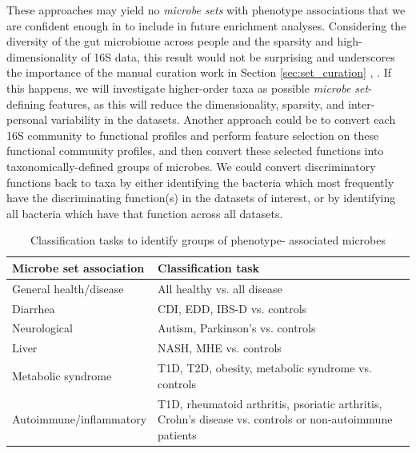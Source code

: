 \documentclass[12pt]{article}
\begin{document}
These approaches may yield no \textit{microbe sets} with phenotype associations
that we are confident enough in to include in future enrichment analyses.
Considering the diversity of the gut microbiome across people and the
sparsity and high-dimensionality of 16S data, 
this result would not be surprising and underscores the importance of the
manual curation work in Section \ref{sec:set_curation} \cite{wang-pval_method-2016}, \cite{knights-biomarkers-2011}.
If this happens, we will investigate higher-order taxa as possible \textit{microbe set}-defining features,
as this will reduce the dimensionality, sparsity, and inter-personal 
variability in the datasets.
Another approach could be to convert each 16S community to functional profiles \cite{langille-picrust-2013}
and perform feature selection on these functional community profiles, and then
convert these selected functions into taxonomically-defined groups of microbes. 
We could convert discriminatory functions back to taxa
by either identifying the bacteria which most frequently have
the discriminating function(s) in the datasets of interest, or by identifying all bacteria which have that function across all datasets.

\begin{table}
\begin{center}
\begin{tabular}{|p{6cm}|p{10cm}|}
	\hline
	\textbf{Microbe set association} & \textbf{Classification task} \\
	\hline
	General health/disease & All healthy vs. all disease \\
	\hline
	Diarrhea & CDI, EDD, IBS-D vs. controls \\
	\hline
	Neurological & Autism, Parkinson's vs. controls \\
	\hline
	Liver & NASH, MHE vs. controls\\
	\hline
	Metabolic syndrome & T1D, T2D, obesity, metabolic syndrome vs. 
	controls \\
	\hline
	Autoimmune/inflammatory & T1D, rheumatoid arthritis, psoriatic arthritis, Crohn's disease 
	vs. controls or non-autoimmune patients \\
	\hline
\end{tabular}
\caption{Classification tasks to identify groups of phenotype-
associated microbes}\label{tab:classifications}
\end{center}
\end{table}
\end{document}
